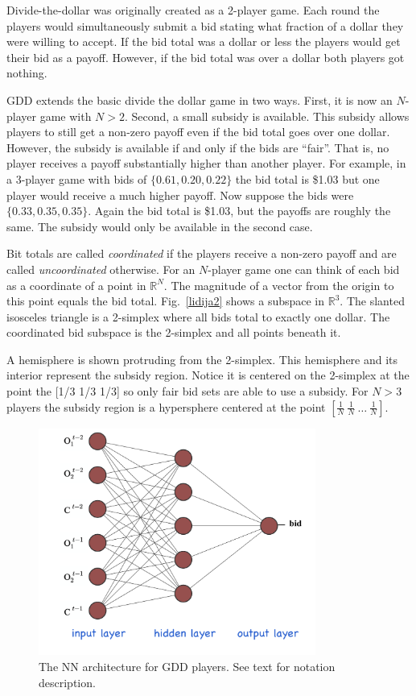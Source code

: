 \documentclass[journal]{IEEEtran} %
\begin{document}
Divide-the-dollar was originally created as a 2-player game. Each round the players would simultaneously submit a bid stating what fraction of a dollar they were willing to accept. If the bid total was a dollar or less the players would get their bid as a payoff. However, if the bid total was over a dollar both players got nothing.

GDD extends the basic divide the dollar game in two ways. First, it is now an $N$-player game with $N>2$. Second, a small subsidy is available. This subsidy allows players to still get a non-zero payoff even if the bid total goes over one dollar. However, the subsidy is available if and only if the bids are ``fair''. That is, no player receives a payoff substantially higher than another player. For example, in a 3-player game with bids of $\{0.61, 0.20, 0.22\}$ the bid total is \$1.03 but one player would receive a much higher payoff. Now suppose the bids were $\{0.33, 0.35, 0.35\}$. Again the bid total is \$1.03, but the payoffs are roughly the same. The subsidy would only be available in the second case.

Bit totals are called \emph{coordinated} if the players receive a non-zero payoff and are called \emph{uncoordinated} otherwise. For an $N$-player game one can think of each bid as a coordinate of a point in $\mathbb{R}^N$. The magnitude of a vector from the origin to this point equals the bid total. Fig.~\ref{lidija2} shows a subspace in $\mathbb{R}^3$. The slanted isosceles triangle is a 2-simplex where all bids total to exactly one dollar. The coordinated bid subspace is the 2-simplex and all points beneath it. 

A hemisphere is shown protruding from the 2-simplex. This hemisphere and its interior represent the subsidy region. Notice it is centered on the 2-simplex at the point the [1/3 1/3 1/3] so only fair bid sets are able to use a subsidy. For $N>3$ players the subsidy region is a hypersphere centered at the point $\left[ \frac{1}{N} \  \frac{1}{N} \  \ldots \  \frac{1}{N} \right]$.



\begin{figure}[htbp]
    \centerline{\includegraphics[width=9.1cm]{arch22.png}}
    \caption{The NN architecture for GDD players. See text for notation description.}
    \label{lidija3}
\end{figure}
\end{document}
